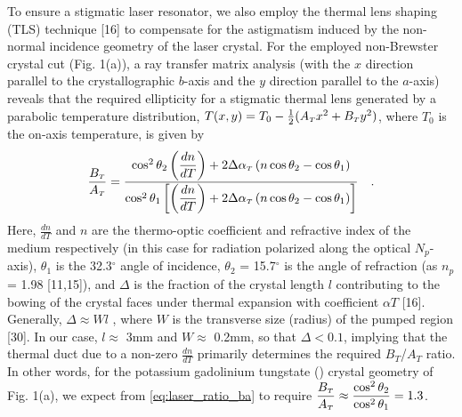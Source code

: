 To ensure a stigmatic laser resonator, we also employ the thermal lens shaping (TLS) technique [16] to compensate for the astigmatism induced by the non-normal incidence geometry of the laser crystal. 
For the employed non-Brewster crystal cut (Fig. 1(a)), a ray
transfer matrix analysis (with the $x$ direction parallel to the crystallographic $b$-axis and the $y$
direction parallel to the $a$-axis) reveals that the required ellipticity for a stigmatic thermal lens
generated by a parabolic temperature distribution, $T(x, y) = T_0 - \frac{1}{2} ( A_{{\scriptscriptstyle T}} x^2 + B_{{\scriptscriptstyle T}} y^2 )$, where $T_0$
is the on-axis temperature, is given by
\begin{equation} \label{eq:laser_ratio_ba}
  \frac{B_{{\scriptscriptstyle T}}}{A_{{\scriptscriptstyle T}}} = 
  \frac{ \cos^2 \theta_2 \left( \dfrac{dn}{dT} \right) + 2 \Delta \alpha_{{\scriptscriptstyle T}} \left( n \cos\theta_2 - \cos\theta_1 \right) }
       { \cos^2 \theta_1 \left[ \left( \dfrac{dn}{dT} \right) + 2 \Delta \alpha_{{\scriptscriptstyle T}} \left( n \cos\theta_2 - \cos\theta_1 \right) \right] }
  \quad\text{.}
\end{equation}
Here, $\frac{dn}{dT}$ and $n$ are the thermo-optic coefficient and refractive index of the medium respectively (in this case for radiation polarized along the optical $N_p$-axis), $\theta_1$ is the 32.3$^\circ$ angle of incidence, $\theta_2$ = 15.7$^\circ$ is the angle of refraction (as $n_p$ = 1.98 [11,15]), and $\Delta$ is the fraction of the crystal length $l$ contributing to the bowing of the crystal faces under thermal
expansion with coefficient $\alpha T$ [16].
Generally, $\Delta \approx W l$ , where $W$ is the transverse size (radius) of the pumped region [30].
In our case, $l \approx$ 3mm and $W \approx$ 0.2mm, so that $\Delta < 0.1$, implying that the thermal duct due to a non-zero $\frac{dn}{dT}$ primarily determines the required $B_T$/$A_T$ ratio.
In other words, for the potassium gadolinium tungstate () crystal geometry of Fig. 1(a), we expect from \ref{eq:laser_ratio_ba} to require $\dfrac{B_{{\scriptscriptstyle T}}}{A_{{\scriptscriptstyle T}}} \approx \dfrac{ \cos^2 \theta_2 }{ \cos^2 \theta_1 } = 1.3$.

